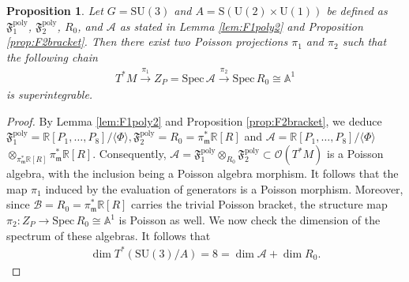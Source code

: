 \documentclass[11pt]{amsart}
\newtheorem{proposition}[theorem]{Proposition}
\theoremstyle{definition}
\theoremstyle{plain}
\theoremstyle{conclusion}
\begin{document}
 
\begin{proposition}
    Let $G = \mathrm{SU}(3)$ and $A = \mathrm{S}(\mathrm{U}(2) \times \mathrm{U}(1))$ be defined as $\mathfrak{F}_1^{\mathrm{poly}}$, $ \mathfrak{F}_2^{\mathrm{poly}}$, $R_0$, and $\mathcal{A}$ as stated in Lemma \ref{lem:F1poly2} and Proposition \ref{prop:F2bracket}. Then there exist two Poisson projections $\pi_1$ and $\pi_2$ such that the following chain  \begin{align}
  T^*M\xrightarrow{\pi_1}Z_P=\mathrm{Spec} \, \mathcal{A} \xrightarrow{\pi_2}\mathrm{Spec}\, R_0\cong\mathbb{A}^1   \label{eq:superchain2}
\end{align} is superintegrable.   
\end{proposition}
\begin{proof}
 By Lemma \ref{lem:F1poly2} and Proposition \ref{prop:F2bracket}, we deduce $ \mathfrak{F}_1^{\mathrm{poly}} =\mathbb{R}[P_1,\ldots,P_8]\big/ \langle \Phi \rangle, \mathfrak{F}_2^{\mathrm{poly}} = R_0 =  \pi_\mathfrak{m}^*\mathbb{R}[R]$ and $\mathcal{A} = \mathbb{R}[P_1,\ldots,P_8]\big/ \langle \Phi \rangle$ $ \otimes_{\pi_\mathfrak{m}^*\mathbb{R}[R]} \pi_\mathfrak{m}^*\mathbb{R}[R]$. Consequently, $\mathcal{A}=\mathfrak{F}_1^{\mathrm{poly}}\otimes_{R_0}\mathfrak{F}_2^{\mathrm{poly}}\subset \mathcal{O}(T^*M)$ is a Poisson algebra, with the inclusion being a Poisson algebra morphism. It follows that the map $\pi_1$ induced by the evaluation of generators is a Poisson morphism. Moreover, since $\mathcal{B}=R_0=\pi_\mathfrak{m}^*\mathbb{R}[R]$ carries the trivial Poisson bracket, the structure map $\pi_2:Z_P\to\mathrm{Spec} \, R_0\cong\mathbb{A}^1$ is Poisson as well. We now check the dimension of the spectrum of these algebras. It follows that \begin{align*}
     \dim T^*(\mathrm{SU}(3)/A) = 8 = \dim \mathcal{A} +  \dim R_0 .
 \end{align*}   


\end{proof}
\end{document}

